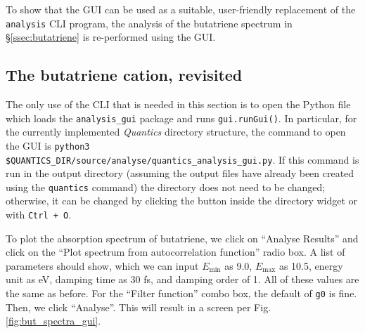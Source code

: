 \documentclass[12pt]{article}
\begin{document}
To show that the GUI can be used as a suitable, user-friendly replacement of the \texttt{analysis} CLI program, the analysis of the butatriene spectrum in \S\ref{ssec:butatriene} is re-performed using the GUI.

\subsection{The butatriene cation, revisited}\label{ssec:butatriene_revisited}

The only use of the CLI that is needed in this section is to open the Python file which loads the \texttt{analysis\_gui} package and runs \texttt{gui.runGui()}. In particular, for the currently implemented \textit{Quantics} directory structure, the command to open the GUI is \texttt{python3 \$QUANTICS\_DIR/source/analyse/quantics\_analysis\_gui.py}. If this command is run in the output directory (assuming the output files have already been created using the \texttt{quantics} command) the directory does not need to be changed; otherwise, it can be changed by clicking the button inside the directory widget or with \texttt{Ctrl + O}.

To plot the absorption spectrum of butatriene, we click on ``Analyse Results'' and click on the ``Plot spectrum from autocorrelation function'' radio box. A list of parameters should show, which we can input \(E_{\text{min}}\) as 9.0, \(E_{\text{max}}\) as 10.5, energy unit as eV, damping time as 30 fs, and damping order of 1. All of these values are the same as before. For the ``Filter function'' combo box, the default of \texttt{g0} is fine. Then, we click  ``Analyse''. This will result in a screen per Fig. \ref{fig:but_spectra_gui}.
\end{document}
